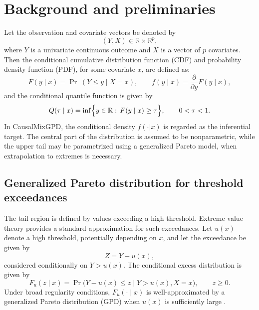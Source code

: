 \documentclass[11pt]{article}\usepackage[]{graphicx}\usepackage[]{xcolor}
\newcommand{\pkg}[1]{\textsf{#1}}
\begin{document}
\section{Background and preliminaries}
\label{sec:prelim}

Let the observation and covariate vectors be denoted by
\begin{equation*}
(Y,X) \in \mathbb{R}\times \mathbb{R}^p,
\end{equation*}
where $Y$ is a univariate continuous outcome and $X$ is a vector of $p$ covariates.
Then the conditional cumulative distribution function (CDF) and probability density function (PDF), for some covariate $x$, are defined as:
\begin{equation*}
F(y\mid x)=\Pr\;(Y\le y\mid X=x),
\qquad
f(y\mid x)=\frac{\partial}{\partial y}F(y\mid x),
\end{equation*}
and the conditional quantile function is given by
\begin{equation*}
Q(\tau\mid x)=\inf\Bigl\{y\in\mathbb{R}:\,F(y\mid x)\ge \tau\Bigr\},
\qquad 0<\tau<1.
\end{equation*}
In \pkg{CausalMixGPD}, the conditional density $f(\cdot|x)$ is regarded as the inferential target.
The central part of the distribution is assumed to be nonparametric, while
the upper tail may be parametrized using a generalized Pareto model, when
extrapolation to extremes is necessary.


\subsection{Generalized Pareto distribution for threshold exceedances}
\label{subsec:gpd}

The tail region is defined by values exceeding a high threshold.
Extreme value theory provides a standard approximation for such
exceedances.  Let $u(x)$ denote a high threshold, potentially
depending on $x$, and let the exceedance be given by
\begin{equation*}
Z = Y - u(x),
\end{equation*}
considered conditionally on $Y > u(x)$.  The conditional excess
distribution is given by
\begin{equation*}
F_u(z\mid x) = \Pr\!\bigl(Y-u(x) \le z \mid Y>u(x), X=x\bigr),
\qquad z \ge 0.
\end{equation*}
Under broad regularity conditions, $F_u(\cdot\mid x)$ is
well-approximated by a generalized Pareto distribution (GPD) when
$u(x)$ is sufficiently large
\citep{BalkemaDeHaan1974,Pickands1975,Coles2001}.
\end{document}
